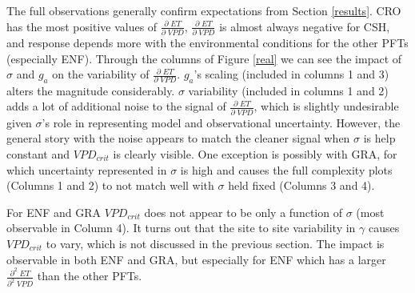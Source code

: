 \documentclass[draft,linenumbers]{agujournal}
\begin{document}
The full observations generally confirm expectations from Section \ref{results}. CRO has the most positive values of $\frac{\partial \; ET}{\partial \; VPD}$, $\frac{\partial \; ET}{\partial \; VPD}$ is almost always negative for CSH, and response depends more with the environmental conditions for the other PFTs (especially ENF). Through the columns of Figure \ref{real} we can see the impact of $\sigma$ and $g_a$ on the variability of $\frac{\partial \; ET}{\partial \; VPD}$. $g_a$'s scaling (included in columns 1 and 3) alters the magnitude considerably. $\sigma$ variability (included in columns 1 and 2) adds a lot of additional noise to the signal of $\frac{\partial \; ET}{\partial \; VPD}$, which is slightly undesirable given $\sigma$'s role in representing model and observational uncertainty. However, the general story with the noise appears to match the cleaner signal when $\sigma$ is help constant and $VPD_{crit}$ is clearly visible. One exception is possibly with GRA, for which uncertainty represented in $\sigma$ is high and causes the full complexity plots (Columns 1 and 2) to not match well with $\sigma$ held fixed (Columns 3 and 4).

For ENF and GRA $VPD_{crit}$ does not appear to be only a function of $\sigma$ (most observable in Column 4). It turns out that the site to site variability in $\gamma$ causes $VPD_{crit}$ to vary, which is not discussed in the previous section. The impact is observable in both ENF and GRA, but especially for ENF which has a larger $\frac{\partial^2 \; ET}{\partial^2 \; VPD}$ than the other PFTs. 
\end{document}
